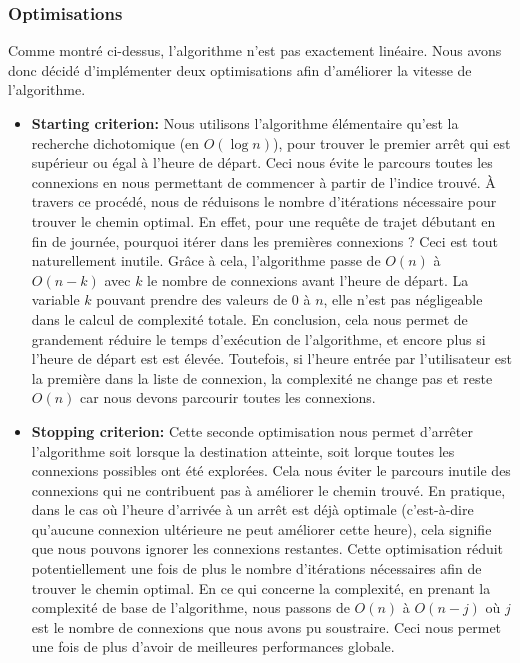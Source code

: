 \documentclass[12pt]{article}
\begin{document}
\subsubsection{Optimisations}
Comme montré ci-dessus, l'algorithme n'est pas exactement linéaire. Nous avons donc décidé d'implémenter deux optimisations afin d'améliorer la vitesse de l'algorithme.
\begin{itemize}
    \item \textbf{Starting criterion:} Nous utilisons l'algorithme élémentaire qu'est la recherche dichotomique (en $O(\log n)$), pour trouver le premier arrêt 
    qui est supérieur ou égal à l'heure de départ. Ceci nous évite le parcours toutes les connexions en nous permettant de commencer à partir de l'indice trouvé.
    À travers ce procédé, nous de réduisons le nombre d'itérations nécessaire pour trouver le chemin optimal. En effet, pour une requête de trajet débutant en fin
    de journée, pourquoi itérer dans les premières connexions ? Ceci est tout naturellement inutile. Grâce à cela, l'algorithme passe de $O(n)$ à $O(n - k)$ 
    avec $k$ le nombre de connexions avant l'heure de départ. La variable $k$ pouvant prendre des valeurs de $0$ à $n$, elle n'est pas négligeable dans le calcul
    de complexité totale. En conclusion, cela nous permet de grandement réduire le temps d'exécution de l'algorithme, et encore plus si l'heure de départ est
    est élevée. Toutefois, si l'heure entrée par l'utilisateur est la première dans la liste de connexion, la complexité ne change pas et reste $O(n)$ car nous
    devons parcourir toutes les connexions.
    \item \textbf{Stopping criterion:} Cette seconde optimisation nous permet d'arrêter l'algorithme soit lorsque la destination atteinte, soit lorque toutes 
    les connexions possibles ont été explorées. Cela nous éviter le parcours inutile des connexions qui ne contribuent pas à améliorer le chemin trouvé. 
    En pratique, dans le cas où l'heure d'arrivée à un arrêt est déjà optimale (c'est-à-dire qu'aucune connexion ultérieure ne peut améliorer cette heure), cela signifie
    que nous pouvons ignorer les connexions restantes. Cette optimisation réduit potentiellement une fois de plus le nombre d'itérations nécessaires afin de trouver le
    chemin optimal. En ce qui concerne la complexité, en prenant la complexité de base de l'algorithme, nous passons de $O(n)$ à $O(n - j)$ où $j$ est le nombre de 
    connexions que nous avons pu soustraire. Ceci nous permet une fois de plus d'avoir de meilleures performances globale.
\end{itemize}
\end{document}
